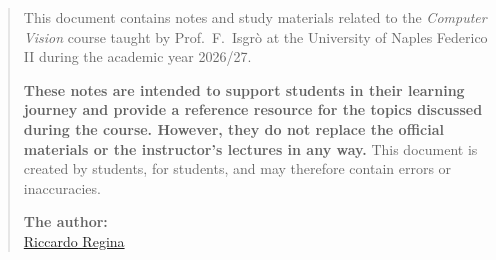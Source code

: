 \begin{abstract}
  This document contains notes and study materials related to the \textit{Computer Vision} course taught by Prof.~F.~Isgrò at the University of Naples Federico II during the academic year 2026/27.

  \textbf{These notes are intended to support students in their learning journey and provide a reference resource for the topics discussed during the course. However, they do not replace the official materials or the instructor's lectures in any way.}
  This document is created by students, for students, and may therefore contain errors or inaccuracies.

  \begin{flushright}
    \vspace{2cm}
    \textbf{The author:}\\
    \href{https://github.com/riccardoregina}{Riccardo Regina} \\
  \end{flushright}
\end{abstract}
